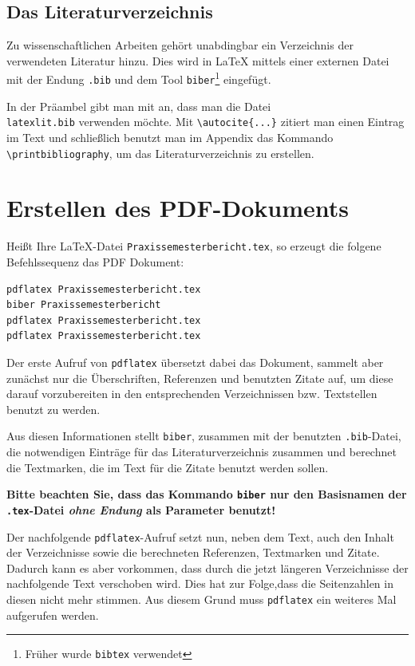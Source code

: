 \documentclass[pdftex,abstracton,a4paper]{scrartcl}
\begin{document}


\subsection{Das Literaturverzeichnis}

Zu wissenschaftlichen Arbeiten gehört unabdingbar ein Verzeichnis der verwendeten Literatur hinzu. Dies wird in \LaTeX{} mittels einer externen Datei mit der Endung \verb+.bib+ und dem Tool \verb+biber+\footnote{Früher wurde \texttt{bibtex} verwendet} eingefügt. 


In der Präambel gibt man mit \verb++ an, dass man die Datei \\\verb+latexlit.bib+ verwenden möchte. Mit  \verb+\autocite{...}+ zitiert man einen Eintrag im Text und schließlich benutzt man im Appendix das Kommando \verb+\printbibliography+, um das Literaturverzeichnis zu erstellen.

\section{Erstellen des PDF-Dokuments}

Heißt Ihre \LaTeX{}-Datei \verb+Praxissemesterbericht.tex+, so erzeugt die folgene Befehlssequenz das PDF Dokument:

\begin{verbatim}
pdflatex Praxissemesterbericht.tex
biber Praxissemesterbericht
pdflatex Praxissemesterbericht.tex
pdflatex Praxissemesterbericht.tex
\end{verbatim}

Der erste Aufruf von \texttt{pdflatex} übersetzt dabei das Dokument, sammelt aber zunächst nur die Überschriften, Referenzen und benutzten Zitate auf, um diese darauf vorzubereiten in den entsprechenden Verzeichnissen bzw. Textstellen benutzt zu werden.

Aus diesen Informationen stellt \texttt{biber}, zusammen mit der benutzten \texttt{.bib}-Datei, die notwendigen Einträge für das Literaturverzeichnis zusammen und berechnet die Textmarken, die im Text für die Zitate benutzt werden sollen.

\textbf{Bitte beachten Sie, dass das Kommando \texttt{biber} nur den Basisnamen der \texttt{.tex}-Datei \textit{ohne Endung} als Parameter benutzt!}

Der nachfolgende \texttt{pdflatex}-Aufruf setzt nun, neben dem Text, auch den Inhalt der Verzeichnisse sowie die berechneten Referenzen, Textmarken und Zitate. Dadurch kann es aber vorkommen, dass durch die jetzt längeren Verzeichnisse der nachfolgende Text verschoben wird. Dies hat zur Folge,dass die Seitenzahlen in diesen nicht mehr stimmen. Aus diesem Grund muss \texttt{pdflatex} ein weiteres Mal aufgerufen werden.

\appendix
\printbibliography[heading=bibintoc]
\end{document}
